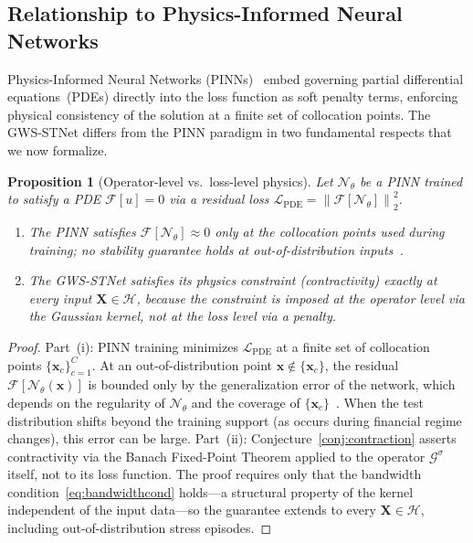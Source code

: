 \documentclass[11pt,a4paper]{article}  %
\newcommand{\norm}[1]{\left\lVert#1\right\rVert}
\theoremstyle{plain}
\newtheorem{proposition}[theorem]{Proposition}
\theoremstyle{definition}
\theoremstyle{remark}
\begin{document}
\subsection{Relationship to Physics-Informed Neural Networks}
\label{subsec:pinn}

Physics-Informed Neural Networks (PINNs)~\cite{Raissi2019} embed
governing partial differential equations~(PDEs) directly into the
loss function as soft penalty terms, enforcing physical consistency
of the solution at a finite set of collocation points. The
GWS-STNet differs from the PINN paradigm in two fundamental respects
that we now formalize.

\begin{proposition}[Operator-level vs.\ loss-level physics]
\label{prop:pinn}
Let $\mathcal{N}_\theta$ be a PINN trained to satisfy a PDE
$\mathcal{F}[u] = 0$ via a residual loss $\mathcal{L}_{\mathrm{PDE}}
= \norm{\mathcal{F}[\mathcal{N}_\theta]}_2^2$.
\begin{enumerate}[label=(\roman*),leftmargin=2em]
\item The PINN satisfies $\mathcal{F}[\mathcal{N}_\theta] \approx 0$
  only at the collocation points used during training; no stability
  guarantee holds at out-of-distribution inputs~\cite{Krishnapriyan2021}.
\item The GWS-STNet satisfies its physics constraint (contractivity)
  exactly at every input $\mathbf{X}\in\mathcal{H}$, because the
  constraint is imposed at the operator level via the Gaussian
  kernel, not at the loss level via a penalty.
\end{enumerate}
\end{proposition}

\begin{proof}
Part~(i): PINN training minimizes $\mathcal{L}_{\mathrm{PDE}}$ at
a finite set of collocation points $\{\mathbf{x}_c\}_{c=1}^C$.
At an out-of-distribution point $\mathbf{x}\notin\{\mathbf{x}_c\}$,
the residual $\mathcal{F}[\mathcal{N}_\theta(\mathbf{x})]$ is
bounded only by the generalization error of the network, which
depends on the regularity of $\mathcal{N}_\theta$ and the
coverage of $\{\mathbf{x}_c\}$~\cite{Mishra2022}. When the test
distribution shifts beyond the training support (as occurs during
financial regime changes), this error can be large.
Part~(ii): Conjecture~\ref{conj:contraction} asserts contractivity
via the Banach Fixed-Point Theorem applied to the operator
$\mathcal{G}^{\sigma}$ itself, not to its loss function. The proof
requires only that the bandwidth condition~\eqref{eq:bandwidthcond}
holds---a structural property of the kernel independent of the
input data---so the guarantee extends to every
$\mathbf{X}\in\mathcal{H}$, including out-of-distribution stress
episodes.
\end{proof}
\end{document}
